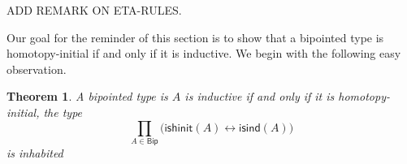 \documentclass[10pt,a4paper,oneside,reqno]{amsart}
\numberwithin{equation}{section}
\theoremstyle{mythm}
\newtheorem{theorem}{Theorem}[section]
\theoremstyle{mydef}
\theoremstyle{myrmk}
\newcommand{\ie}{\text{i.e.\ }}
\newcommand{\Bip}{\mathsf{Bip}}
\newcommand{\ishinit}{\mathsf{ishinit}}
\newcommand{\isind}{\mathsf{isind}}
\begin{document}
\medskip
 
 ADD REMARK ON ETA-RULES.
 
 \medskip




Our goal for the reminder of this section is to show that a bipointed type is homotopy-initial if and only
if it is inductive. We begin with the following easy observation.






\begin{theorem}\label{thm:bipointedmain} A bipointed type 
is  $A$ is inductive if and only if it is homotopy-initial, \ie  the type
\[
\prod_{A \in \Bip} \big(  \ishinit(A) \leftrightarrow \isind(A) \big)
\] 
is inhabited
\end{theorem}
\end{document}
